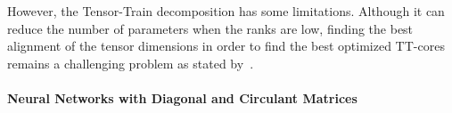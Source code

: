 However, the Tensor-Train decomposition has some limitations.
Although it can reduce the number of parameters when the ranks are low, finding the best alignment of the tensor dimensions in order to find the best optimized TT-cores remains a challenging problem as stated by~\citet{pan2019compressing}.





\paragraph{Neural Networks with Diagonal and Circulant Matrices} ~\\

\noindent

%







